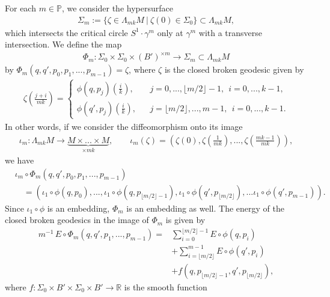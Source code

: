 \documentclass[reqno]{amsart}
\numberwithin{equation}{section}
\theoremstyle{personal}%
\theoremstyle{definition}
\newcommand{\R}{\mathds{R}}
\newcommand{\PP}{\mathds{P}}
\begin{document}
For each $m\in\PP$, we consider the hypersurface
\begin{align*}
 \Sigma_m:=\big\{ \zeta\in\Lambda_{mk}M\ \big|\ \zeta(0)\in\Sigma_0\big\}\subset \Lambda_{mk}M,
\end{align*}
which intersects the critical circle $S^1\cdot\gamma^m$ only at $\gamma^m$ with a transverse intersection. We define the map
\begin{align*}
\Phi_m: \Sigma_0\times \Sigma_0\times (B')^{\times m}\to \Sigma_{m}\subset\Lambda_{mk}M
\end{align*}
by $\Phi_m(q,q',p_0,p_1,...,p_{m-1})=\zeta$, where $\zeta$ is the closed broken geodesic given by
\begin{align*}
 \zeta(\tfrac{j+i}{mk})
 =
 \left\{
   \begin{array}{lll}
    \phi(q,p_j)(\tfrac ik), &  & j=0,...,\lfloor m/2\rfloor-1,\ \ i=0,...,k-1, \\ 
    \phi(q',p_j)(\tfrac ik), &  & j=\lfloor m/2\rfloor,...,m-1,\ \ i=0,...,k-1.
  \end{array}
 \right.
\end{align*}
In other words, if we consider the diffeomorphism onto its image 
\begin{align*}
 \iota_m:\Lambda_{mk}M\to \underbrace{M\times...\times M}_{\times mk},
 \qquad
 \iota_m(\zeta)=(\zeta(0),\zeta(\tfrac 1{mk}),...,\zeta(\tfrac{mk-1}{mk})),
\end{align*}
we have
\begin{align*}
&\iota_m\circ\Phi_m(q,q',p_0,p_1,...,p_{m-1})\\
&\quad=(\iota_1\circ\phi(q,p_0),...,\iota_1\circ\phi(q,p_{\lfloor m/2\rfloor-1}),\iota_1\circ\phi(q',p_{\lfloor m/2\rfloor}),...\iota_1\circ\phi(q',p_{m-1})).
\end{align*}
Since $\iota_1\circ\phi$ is an embedding, $\Phi_m$ is an embedding as well. The energy of the closed broken geodesics in the image of $\Phi_m$ is given by
\begin{equation}
\label{e:energy_Phi_m}
\begin{split}
 m^{-1}\,E\circ \Phi_m(q,q',p_1,...,p_{m-1}) = & \sum_{i=0}^{\lfloor m/2\rfloor-1}E\circ\phi(q,p_i) \\  
 & 
 +\sum_{i=\lfloor m/2\rfloor}^{m-1}E\circ\phi(q',p_i) \\
 & + 
f(q,p_{\lfloor m/2\rfloor-1},q',p_{\lfloor m/2\rfloor}), 
\end{split}
\end{equation}
where $f:\Sigma_0\times B'\times \Sigma_0\times B'\to\R$ is the smooth function 
\end{document}
